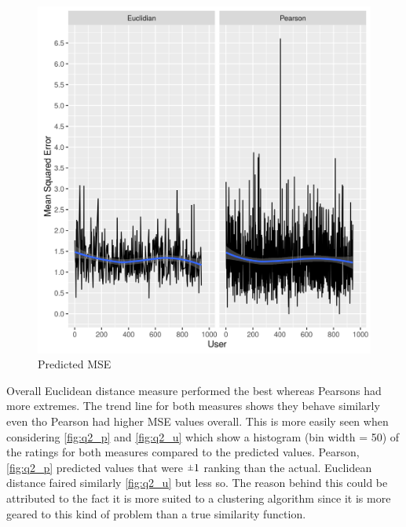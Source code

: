 \documentclass[11pt]{article}
\newcommand{\rpm}{\sbox0{$1$}\sbox2{$\scriptstyle\pm$}
  \raise\dimexpr(\ht0-\ht2)/2\relax\box2 }
\begin{document}
\begin{figure}[H]
\centering
\includegraphics[scale=.8]{user_predicted_mse.png}
\caption{Predicted MSE}
\label{fig:q2_mse}
\end{figure}
\clearpage
Overall Euclidean distance measure performed the best whereas Pearsons had more extremes. The trend line for both measures shows they behave similarly even tho Pearson had higher MSE values overall. This is more easily seen when considering \autoref{fig:q2_p} and \autoref{fig:q2_u} which show a histogram (bin width = 50) of the ratings for both measures compared to the predicted values. Pearson, \autoref{fig:q2_p} predicted values that were $\rpm 1$ ranking than the actual. Euclidean distance faired similarly \autoref{fig:q2_u} but less so. The reason behind this could be attributed to the fact it is more suited to a clustering algorithm since it is more geared to this kind of problem than a true similarity function.
\end{document}
